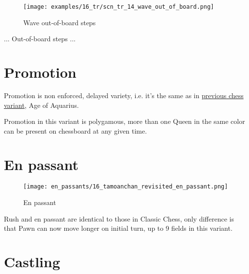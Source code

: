 \vspace*{-1.0\baselineskip}
\noindent
\begin{figure}[!h]
\texttt{[image: examples/16\_tr/scn\_tr\_14\_wave\_out\_of\_board.png]}
\caption{Wave out-of-board steps}
\label{fig:scn_tr_14_wave_out_of_board}
\end{figure}

... Out-of-board steps ...

\clearpage %

\section*{Promotion}

Promotion is non enforced, delayed variety, i.e. it's the same as in
\hyperref[sec:Age of Aquarius/Promotion]{previous chess variant}, Age of Aquarius.

Promotion in this variant is polygamous, more than one Queen in the same color
can be present on chessboard at any given time.

\clearpage %

\section*{En passant}

\noindent
\begin{wrapfigure}{l}{0.4\textwidth}
\centering
\texttt{[image: en\_passants/16\_tamoanchan\_revisited\_en\_passant.png]}
\caption{En passant}
\label{fig:16_tamoanchan_revisited_en_passant}
\end{wrapfigure}
Rush and en passant are identical to those in Classic Chess, only difference
is that Pawn can now move longer on initial turn, up to 9 fields in this
variant.

\clearpage %

\section*{Castling}

